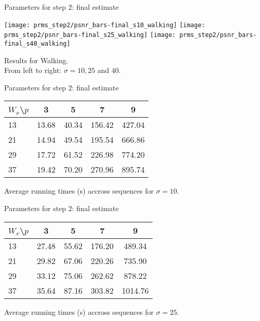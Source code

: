 \documentclass[mathserif, 8pt]{beamer}
\makeatletter
\newcounter{multipleslide}
\newcommand{\multipleframe}{%
\setcounter{multipleslide}{\value{framenumber}}
\stepcounter{multipleslide}
\patchcmd{\beamer@@tmpl@footline}%
	{\insertframenumber}%
	{\themultipleslide}%
	{}%
	{}%
}
\newcommand{\restoreframe}{%
\patchcmd{\beamer@@tmpl@footline}%
	{\themultipleslide}%
	{\insertframenumber}%
	{}%
	{}%
\setcounter{framenumber}{\value{multipleslide}}%
}
\makeatother
\begin{document}
\begin{frame}{Parameters for step 2: final estimate}
	\begin{center}
		\texttt{[image: prms\_step2/psnr\_bars-final\_s10\_walking]}%
		\texttt{[image: prms\_step2/psnr\_bars-final\_s25\_walking]}%
		\texttt{[image: prms\_step2/psnr\_bars-final\_s40\_walking]}

		\bigskip

		Results for Walking.\\From left to right: $\sigma = 10, 25$ and $40$.
	\end{center}
\end{frame}
\restoreframe

\multipleframe
\begin{frame}{Parameters for step 2: final estimate}
	\begin{center}
		\begin{tabular}{l | c c c c }
			 $W_x$\textbackslash $p$ & 3  & 5  & 7  & 9 \\\hline\hline
			 13 & 13.68 &  40.34 & 156.42 & 427.04 \\
			 21 & 14.94 &  49.54 & 195.54 & 666.86 \\
			 29 & 17.72 &  61.52 & 226.98 & 774.20 \\
			 37 & 19.42 &  70.20 & 270.96 & 895.74 \\
		\end{tabular}

		\bigskip

		Average running times (s) accross sequences for $\sigma = 10$.
	\end{center}
\end{frame}

\begin{frame}{Parameters for step 2: final estimate}
	\begin{center}
		\begin{tabular}{l | c c c c }
			 $W_x$\textbackslash $p$ & 3  & 5  & 7  & 9 \\\hline\hline
			 13 & 27.48 &  55.62 & 176.20 & 489.34  \\
			 21 & 29.82 &  67.06 & 220.26 & 735.90  \\
			 29 & 33.12 &  75.06 & 262.62 & 878.22  \\
			 37 & 35.64 &  87.16 & 303.82 & 1014.76 \\
		\end{tabular}

		\bigskip

		Average running times (s) accross sequences for $\sigma = 25$.
	\end{center}
\end{frame}
\end{document}
